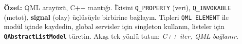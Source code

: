 \documentclass[11pt,a4paper]{article}
\newcommand{\kls}[1]{\texttt{\color{anaMavi}\textbf{#1}}}
\newcommand{\kod}[1]{\texttt{\color{koyuGri}#1}}
\begin{document}
\vspace{0.6cm}
\begin{tcolorbox}[colback=qtYesil!8,colframe=qtYesil!70!koyuGri,arc=3pt,boxrule=1pt]
\centering
\textbf{Özet:} QML arayüzü, C++ mantığı. İkisini \kod{Q\_PROPERTY} (veri),
\kod{Q\_INVOKABLE} (metot), \textbf{signal} (olay) üçlüsüyle birbirine bağlayın.
Tipleri \kod{QML\_ELEMENT} ile modül içinde kaydedin, global servisler için
singleton kullanın, listeler için \kls{QAbstractListModel} türetin. Akışı tek
yönlü tutun: \emph{C++ iter, QML bağlanır.}
\end{tcolorbox}
\end{document}
